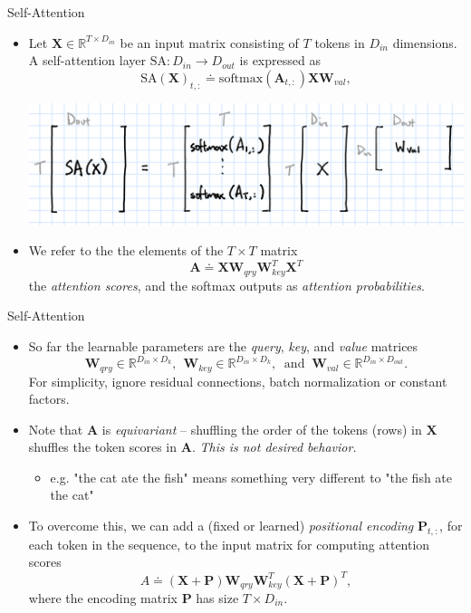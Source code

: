 \documentclass[9pt]{beamer}
\newcommand{\bb}{\mathbb}
\newcommand{\mb}{\bm}
\begin{document}
\begin{frame}{Self-Attention}
\begin{itemize}
\item Let $\bm X\in\bb R^{T\times D_{in}}$ be an input matrix consisting of $T$ tokens in $D_{in}$ dimensions. A self-attention layer $\text{SA}:D_{in}\rightarrow D_{out}$ is expressed as
\begin{equation}
  \text{SA}(\mb X)_{t,:} \doteq \text{softmax}(\mb A_{t,:})\mb X\mb W_{val},
\end{equation}
\begin{center}
    \includegraphics[width=.7\textwidth]{images/softmax.PNG}
\end{center}
\vspace{.1in}

\item We refer to the the elements of the $T\times T$ matrix
\begin{equation}
\mb A \doteq \mb X \mb W_{qry}\mb W_{key}^T\mb X^T
\end{equation}
the {\em attention scores}, and the softmax outputs as {\em attention probabilities}.
\end{itemize}
\end{frame}


\begin{frame}{Self-Attention}
\begin{itemize}
\item So far the learnable parameters are the {\em query}, {\em key}, and {\em value} matrices
$$\mb W_{qry} \in \bb R^{D_{in}\times{D_k}}, \ \ 
\mb W_{key} \in \bb R^{D_{in}\times{D_k}},\ \text{ and } \ 
\mb W_{val} \in \bb R^{D_{in}\times{D_{out}}}.$$
For simplicity, ignore residual connections, batch normalization or constant factors.

\vspace{.1in}
\item Note that $\bm A$ is {\em equivariant} -- shuffling the order of the tokens (rows) in $\bm X$ shuffles the token scores in $\bm A$. {\em This is not desired behavior.}
\begin{itemize}
    \item e.g. "the cat ate the fish" means something very different to "the fish ate the cat"
\end{itemize}

\vspace{.1in}
\item To overcome this, we can add a (fixed or learned) {\em positional encoding} $\bm P_{t,:}$, for each token in the sequence, to the input matrix for computing attention scores
\begin{equation}
A \doteq (\mb X + \mb P)\mb W_{qry}\mb W_{key}^T (\mb X + \mb P)^T,
\end{equation}
where the encoding matrix $\bm P$ has size $T\times D_{in}$.
\end{itemize}
\end{frame}
\end{document}
